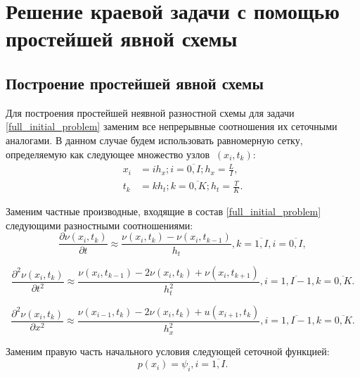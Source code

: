 \section{Решение краевой задачи с помощью простейшей явной схемы}
{
	\subsection{Построение простейшей явной схемы}{
			Для построения простейшей неявной разностной схемы для задачи \eqref{full_initial_problem} заменим все непрерывные соотношения их сеточными аналогами. В данном случае будем использовать равномерную сетку, определяемую как следующее множество узлов $\ (x_{i}, t_{k}) $:
			\begin{equation} \label{grid_xt}
				\begin{split}
				x_{i} &= ih_x; i = \overline{ 0, I}; h_x = \frac{L}{I},\\
				t_{k} &= kh_t; k = \overline{ 0, K}; h_t = \frac{T}{K}.
				\end{split}
			\end{equation}
			
		
			Заменим частные производные, входящие в состав \eqref{full_initial_problem} следующими 
			разностными соотношениями:
			\begin{equation} \label{time_analog_1}
		 		\frac{\partial \nu(x_i, t_k)}{\partial t} \approx \frac{\nu(x_i, t_k) - \nu(x_i, t_{k-1})}{h_t}, k =  \overline{ 1, I}, i =  \overline{ 0, I},
			\end{equation}
			
			\begin{equation} \label{time_analog}
		 		\frac{\partial^2 \nu(x_i, t_k)}{\partial t^2} \approx \frac{\nu(x_i, t_{k-1}) - 2\nu(x_i, t_k) + \nu(x_i, t_{k+1})}{h_t^2},  i =  \overline{ 1, I-1}, k =  \overline{ 0, K}.
			\end{equation}
			
			\begin{equation} \label{dimensional_analog}
			\frac{\partial^2 \nu(x_i, t_k)}{\partial x^2} \approx \frac{\nu(x_{i-1}, t_k) - 2\nu(x_i, t_k) + u(x_{i+1}, t_k)}{h_x^2},  i =  \overline{ 1, I-1}, k =  \overline{ 0, K}.
			\end{equation}
			
			Заменим правую часть начального условия следующей сеточной функцией:
			\begin{equation} \label{gamma_tk}
				p(x_i) = \psi_i, i = \overline{1, I}.
			\end{equation}
			
}}
